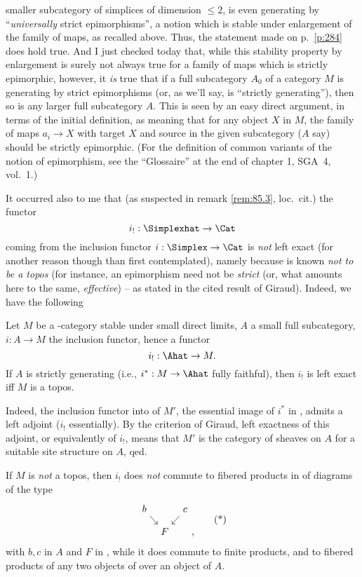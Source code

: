 smaller subcategory of simplices of dimension $\le 2$, is
even generating by ``\emph{universally} strict
epimorphisms'', a notion which is stable under enlargement of the
family of maps, as recalled above. Thus, the statement made on p.\
\ref{p:284} does hold true. And I just checked today that, while this
stability property by enlargement is surely not always true for a
family of maps which is strictly epimorphic, however, it \emph{is}
true that if a full subcategory $A_0$ of a category $M$ is generating
by strict epimorphisms (or, as we'll say, is ``strictly generating''),
then so is any larger full subcategory $A$. This is seen by an easy
direct argument, in terms of the initial definition, as meaning that
for any object $X$ in $M$, the family of maps $a_i\to X$ with target
$X$ and source in the given subcategory ($A$ say) should be strictly
epimorphic. (For\scrcomment{\textcite{SGA4vol1}} the definition of
common variants of the notion of epimorphism, see the ``Glossaire'' at
the end of chapter 1, SGA~4, vol.~1.)

It occurred also to me that (as suspected in remark \ref{rem:85.3},
loc.\ cit.) the functor
\[i_!: \Simplexhat\to\Cat\]
coming from the inclusion functor $i:\Simplex\to\Cat$ is \emph{not}
left exact (for another reason though than first contemplated), namely
because \Cat{} is known \emph{not to be a topos} (for instance, an
epimorphism need not be \emph{strict} (or, what amounts here to the
same, \emph{effective}) -- as stated in the cited result of
Giraud). Indeed, we have the following
\begin{proposition}
  Let $M$ be a \scrU-category stable under small direct limits, $A$ a
  small full subcategory, $i:A\to M$ the inclusion functor, hence a
  functor
  \[i_!:\Ahat\to M.\]
  If $A$ is strictly generating \textup(i.e., $i^*:M\to\Ahat$ fully
  faithful\textup), then $i_!$ is left exact if{f} $M$ is a topos.
\end{proposition}

Indeed, the inclusion functor into \Ahat{} of $M'$, the essential
image of $i^*$ in \Ahat, admits a left adjoint ($i_!$ essentially). By
the criterion of Giraud, left exactness of this adjoint, or
equivalently of $i_!$, means that $M'$ is the category of sheaves on
$A$ for a suitable site structure on $A$, qed.
\begin{corollary}
  If $M$ is \emph{not} a topos, then $i_!$ does \emph{not} commute to
  fibered products in \Ahat{} of diagrams of the type
  \begin{equation}
    \label{eq:89.star}
    \begin{tabular}{@{}c@{}}
      \begin{tikzcd}[baseline=(O.base),column sep=tiny,row sep=small]
        b\ar[dr] & & c\ar[dl] \\ & |[alias=O]| F &
      \end{tikzcd},
    \end{tabular}\tag{*}
  \end{equation}
  with $b,c$ in $A$ and $F$ in \Ahat, while it does
  commute to finite products, and to fibered products of any two
  objects of \Ahat{} over an object of $A$\kern1pt.
\end{corollary}

